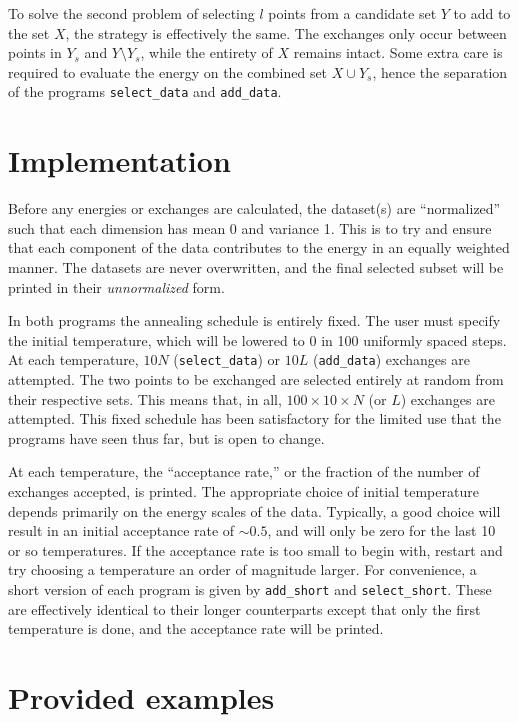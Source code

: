 \documentclass{article}
\begin{document}
To solve the second problem of selecting $l$ points from a candidate set $Y$ to add to the set $X$, the strategy is effectively the same.
The exchanges only occur between points in $Y_s$ and $Y \setminus Y_s$, while the entirety of $X$ remains intact.
Some extra care is required to evaluate the energy on the combined set $X \cup Y_s$, hence the separation of the programs \texttt{select\_data} and \texttt{add\_data}.

\section{Implementation}

Before any energies or exchanges are calculated, the dataset(s) are ``normalized'' such that each dimension has mean 0 and variance 1.
This is to try and ensure that each component of the data contributes to the energy in an equally weighted manner.
The datasets are never overwritten, and the final selected subset will be printed in their \emph{unnormalized} form.

In both programs the annealing schedule is entirely fixed.
The user must specify the initial temperature, which will be lowered to 0 in 100 uniformly spaced steps.
At each temperature, $10 N$ (\texttt{select\_data}) or $10 L$ (\texttt{add\_data}) exchanges are attempted.
The two points to be exchanged are selected entirely at random from their respective sets.
This means that, in all, $100 \times 10 \times N$ (or $L$) exchanges are attempted.
This fixed schedule has been satisfactory for the limited use that the programs have seen thus far, but is open to change.

At each temperature, the ``acceptance rate,'' or the fraction of the number of exchanges accepted, is printed.
The appropriate choice of initial temperature depends primarily on the energy scales of the data.
Typically, a good choice will result in an initial acceptance rate of $\sim 0.5$, and will only be zero for the last 10 or so temperatures.
If the acceptance rate is too small to begin with, restart and try choosing a temperature an order of magnitude larger.
For convenience, a short version of each program is given by \texttt{add\_short} and \texttt{select\_short}.
These are effectively identical to their longer counterparts except that only the first temperature is done, and the acceptance rate will be printed.

\section{Provided examples}
\end{document}
